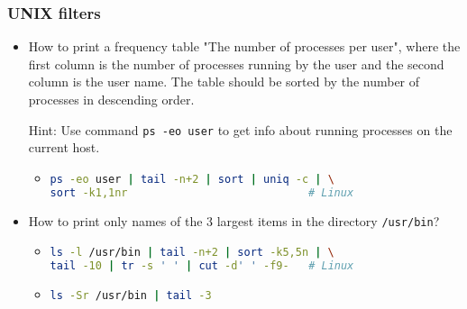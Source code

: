 \begin{frame}[fragile]
\frametitle{UNIX filters}
	\begin{itemize}
	
		\item How to print a frequency table "The number of processes per user",
			where the first column is the number of processes running by the user 
			and the second column is the user name. The table should be sorted by the number of processes in descending order.
		
			\vspace{5mm}
			Hint: Use command \texttt{ps -eo user} to get info about running processes on the current host. 		
		\begin{itemize}
			\item
\begin{lstlisting}[language=bash]		
ps -eo user | tail -n+2 | sort | uniq -c | \
sort -k1,1nr                            # Linux
\end{lstlisting}
		\end{itemize}

		\item How to print only names of the 3 largest items in the directory \texttt{/usr/bin}?			
		\begin{itemize}
			\item
\begin{lstlisting}[language=bash]		
ls -l /usr/bin | tail -n+2 | sort -k5,5n | \
tail -10 | tr -s ' ' | cut -d' ' -f9-   # Linux
\end{lstlisting}

			\item
\begin{lstlisting}[language=bash]	
ls -Sr /usr/bin | tail -3
\end{lstlisting}
		\end{itemize}
			
	\end{itemize}
\end{frame}

